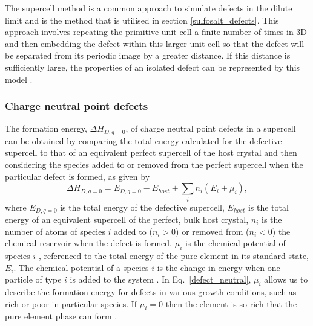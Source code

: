 \documentclass[11pt, twoside]{report}
\begin{document}
The supercell method is a common approach to simulate defects in the dilute limit and is the method that is utilised in section \ref{sulfosalt_defects}. This approach involves repeating the primitive unit cell a finite number of times in 3D and then embedding the defect within this larger unit cell so that the defect will be separated from its periodic image by a greater distance. If this distance is sufficiently large, the properties of an isolated defect can be represented by this model \cite{freysoldt_rev}.

\subsubsection{Charge neutral point defects}
The formation energy, $\Delta H_{D,q=0}$, of charge neutral point defects in a supercell can be obtained by comparing the total energy calculated for the defective supercell to that of an equivalent perfect supercell of the host crystal and then considering the species added to or removed from the perfect supercell when the particular defect is formed, as given by
\begin{equation}\label{defect_neutral}
\Delta H_{D,q=0} = E_{D,q=0} - E_{host} + \sum_i n_i (E_i + \mu_i ),
\end{equation}
where $E_{D,q=0}$ is the total energy of the defective supercell, $E_{host}$ is the total energy of an equivalent supercell of the perfect, bulk host crystal, $n_i$ is the number of atoms of species $i$ added to ($n_i > 0 $) or removed from ($n_i < 0$) the chemical reservoir when the defect is formed. $\mu_i$ is the chemical potential of species $i$ \cite{ZhangNorthup_defect_formation}, referenced to the total energy of the pure element in its standard state, $E_i$. The chemical potential of a species $i$ is the change in energy when one particle of type $i$ is added to the system \cite{chem_pot}. In Eq.~\ref{defect_neutral}, $\mu_i$ allows us to describe the formation energy for defects in various growth conditions, such as rich or poor in particular species. If $\mu_i = 0$ then the element is so rich that the pure element phase can form \cite{defects_Chen}.
\end{document}

